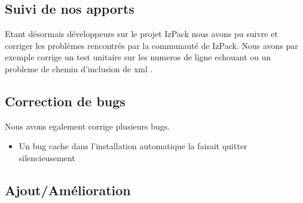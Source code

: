 \subsection{Suivi de nos apports}
Etant désormais développeurs sur le projet IzPack nous avons pu suivre et corriger les problèmes rencontrés par la communauté de IzPack.
Nous avons par exemple corrige un test unitaire sur les numeros de ligne echouant \cite{IZPACK-306} ou un probleme de chemin d'inclusion de xml \cite{IZPACK-303}.

\subsection{Correction de bugs}
Nous avons egalement corrige plusieurs bugs.
\begin{itemize}
 \item Un bug cache dans l'installation automatique la faisait quitter silencieusement \cite{IZPACK-309}
\end{itemize}

\subsection{Ajout/Amélioration}
